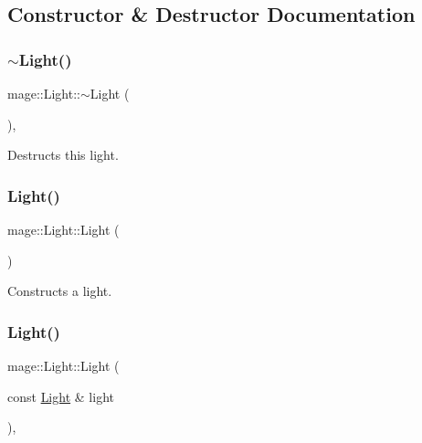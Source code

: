 \subsection{Constructor \& Destructor Documentation}
\hypertarget{classmage_1_1_light_af877bc473dede83689a4bda8a36d4d36}{}\label{classmage_1_1_light_af877bc473dede83689a4bda8a36d4d36} 
\subsubsection{\texorpdfstring{$\sim$\+Light()}{~Light()}}
{\footnotesize\ttfamily mage\+::\+Light\+::$\sim$\+Light (\begin{DoxyParamCaption}{ }\end{DoxyParamCaption})\hspace{0.3cm}{\ttfamily [virtual]}, {\ttfamily [default]}}

Destructs this light. \hypertarget{classmage_1_1_light_a5c1b256aef7e22faafcce7ea2fa8f858}{}\label{classmage_1_1_light_a5c1b256aef7e22faafcce7ea2fa8f858} 
\subsubsection{\texorpdfstring{Light()}{Light()}\hspace{0.1cm}{\footnotesize\ttfamily [1/3]}}
{\footnotesize\ttfamily mage\+::\+Light\+::\+Light (\begin{DoxyParamCaption}{ }\end{DoxyParamCaption})\hspace{0.3cm}{\ttfamily [protected]}}

Constructs a light. \hypertarget{classmage_1_1_light_aa91ba3fde50487939d99252c73f732cc}{}\label{classmage_1_1_light_aa91ba3fde50487939d99252c73f732cc} 
\subsubsection{\texorpdfstring{Light()}{Light()}\hspace{0.1cm}{\footnotesize\ttfamily [2/3]}}
{\footnotesize\ttfamily mage\+::\+Light\+::\+Light (\begin{DoxyParamCaption}\item[{const \hyperlink{classmage_1_1_light}{Light} \&}]{light }\end{DoxyParamCaption})\hspace{0.3cm}{\ttfamily [protected]}, {\ttfamily [default]}}

